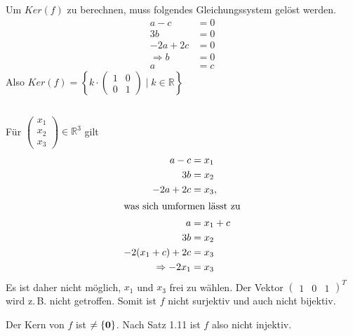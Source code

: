 \documentclass{../mfa}
\begin{document}
\subsection{}
Um $Ker(f)$ zu berechnen, muss folgendes Gleichungssystem gelöst werden.
\begin{align*}
   a - c    & = 0 \\
   3b       & = 0 \\
   -2a + 2c & = 0 \\
   \Rightarrow b &= 0 \\
   a &= c
\end{align*}
Also $Ker(f) = \left\{k \cdot \begin{pmatrix} 1 & 0 \\ 0 & 1 \end{pmatrix} \mid k \in \mathbb{R} \right\}$

\subsection{}

Für $\begin{pmatrix} x_1 \\ x_2 \\ x_3 \end{pmatrix}\in \mathbb{R}^3$ gilt 
\begin{align*}
   a - c                                  & = x_1 \\
   3b                                     & = x_2 \\
   -2a + 2c                               & = x_3, \\
   \intertext{was sich umformen lässt zu}
   a                                      & = x_1 + c \\
   3b                                     & = x_2 \\
   -2(x_1 + c) + 2c                       & = x_3 \\
   \Rightarrow -2x_1                      & = x_3
\end{align*}
Es ist daher nicht möglich, $x_1$ und $x_3$ frei zu wählen. Der Vektor
$\begin{pmatrix} 1 & 0 & 1 \end{pmatrix}^T$ wird z.\,B. nicht getroffen. Somit
ist $f$ nicht surjektiv und auch nicht bijektiv.

Der Kern von $f$ ist $\neq \{\mathbf{0}\}$. Nach Satz 1.11 ist $f$ also nicht injektiv.

\section{}
\end{document}
